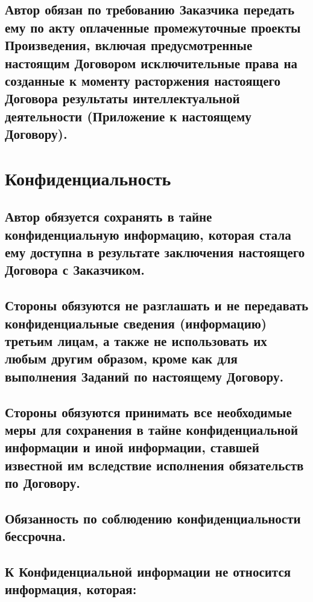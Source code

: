 \documentclass[12pt]{article}
\begin{document}
\subsection{Автор обязан по требованию Заказчика передать ему по акту оплаченные промежуточные проекты Произведения, включая предусмотренные настоящим Договором исключительные права на созданные к моменту расторжения настоящего Договора результаты интеллектуальной деятельности (Приложение  к настоящему Договору).}

\section{Конфиденциальность}

\subsection{Автор обязуется сохранять в тайне конфиденциальную информацию, которая стала ему доступна в результате заключения настоящего Договора с Заказчиком.}

\subsection{Стороны обязуются не разглашать и не передавать конфиденциальные сведения (информацию) третьим лицам, а также не использовать их любым другим образом, кроме как для выполнения Заданий по настоящему Договору.}

\subsection{Стороны обязуются принимать все необходимые меры для сохранения в тайне конфиденциальной информации и иной информации, ставшей известной им вследствие исполнения обязательств по Договору.}

\subsection{Обязанность по соблюдению конфиденциальности бессрочна.}

\subsection{К Конфиденциальной информации не относится информация, которая:}
\end{document}
